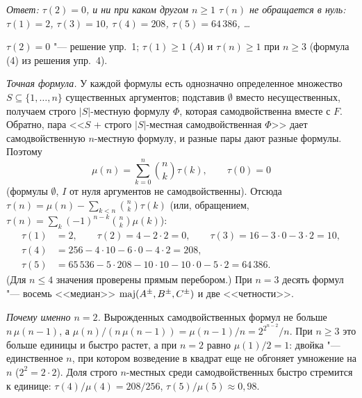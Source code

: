 \begin{solution}[6 (\S\,3)]
\emph{Ответ: $\tau(2)=0$, и ни при каком другом $n\ge1$ $\tau(n)$ не
обращается в нуль: $\tau(1)=2$, $\tau(3)=10$, $\tau(4)=208$,
$\tau(5)=64\,386$, \dots}

$\tau(2)=0$ "--- решение упр.~1; $\tau(1)\ge1$ ($A$) и $\tau(n)\ge1$ при
$n\ge3$ (формула (4) из решения упр.~4).

\emph{Точная формула.} У каждой формулы есть однозначно определенное
множество $S\subseteq\{1,\dots,n\}$ существенных аргументов; подставив
$\emptyset$ вместо несущественных, получаем строго $|S|$-местную формулу
$\Phi$, которая самодвойственна вместе с $F$. Обратно, пара <<$S$ +
строго $|S|$-местная самодвойственная $\Phi$>> дает самодвойственную
$n$-местную формулу, и разные пары дают разные формулы. Поэтому
\[
\mu(n)=\sum_{k=0}^{n}\binom nk\tau(k),\qquad \tau(0)=0
\]
(формулы $\emptyset$, $I$ от нуля аргументов не самодвойственны). Отсюда
$\tau(n)=\mu(n)-\sum_{k<n}\binom nk\tau(k)$ (или, обращением,
$\tau(n)=\sum_k(-1)^{n-k}\binom nk\mu(k)$):
\[
\begin{aligned}
\tau(1)&=2,\qquad \tau(2)=4-2\cdot2=0,\qquad \tau(3)=16-3\cdot0-3\cdot2=10,\\
\tau(4)&=256-4\cdot10-6\cdot0-4\cdot2=208,\\
\tau(5)&=65\,536-5\cdot208-10\cdot10-10\cdot0-5\cdot2=64\,386 .
\end{aligned}
\]
(Для $n\le4$ значения проверены прямым перебором.) При $n=3$ десять
формул "--- восемь <<медиан>> $\operatorname{maj}(A^{\pm},B^{\pm},C^{\pm})$ и две
<<четности>>.

\emph{Почему именно $n=2$.} Вырожденных самодвойственных формул не
больше $n\,\mu(n-1)$, а $\mu(n)/(n\,\mu(n-1))=\mu(n-1)/n=2^{2^{n-2}}/n$.
При $n\ge3$ это больше единицы и быстро растет, а при $n=2$ равно
$\mu(1)/2=1$: двойка "--- единственное $n$, при котором возведение
в квадрат еще не обгоняет умножение на $n$ ($2^2=2\cdot2$). Доля строго
$n$-местных среди самодвойственных быстро стремится к единице:
$\tau(4)/\mu(4)=208/256$, $\tau(5)/\mu(5)\approx0{,}98$.
\end{solution}

